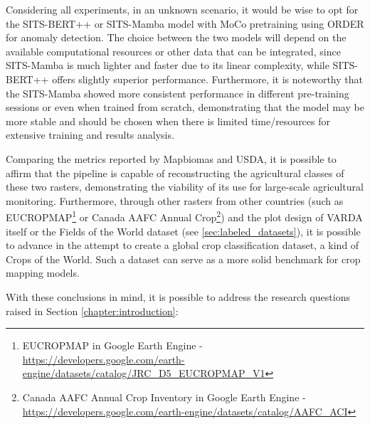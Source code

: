 Considering all experiments, in an unknown scenario, it would be wise to opt for the SITS-BERT++ or SITS-Mamba model with MoCo pretraining using \ac{ORDER} for anomaly detection. The choice between the two models will depend on the available computational resources or other data that can be integrated, since SITS-Mamba is much lighter and faster due to its linear complexity, while SITS-BERT++ offers slightly superior performance. Furthermore, it is noteworthy that the SITS-Mamba showed more consistent performance in different pre-training sessions or even when trained from scratch, demonstrating that the model may be more stable and should be chosen when there is limited time/resources for extensive training and results analysis.

Comparing the metrics reported by Mapbiomas and USDA, it is possible to affirm that the pipeline is capable of reconstructing the agricultural classes of these two rasters, demonstrating the viability of its use for large-scale agricultural monitoring. Furthermore, through other rasters from other countries (such as EUCROPMAP\footnote{EUCROPMAP in Google Earth Engine - \url{https://developers.google.com/earth-engine/datasets/catalog/JRC_D5_EUCROPMAP_V1}} or Canada AAFC Annual Crop\footnote{Canada AAFC Annual Crop Inventory in Google Earth Engine - \url{https://developers.google.com/earth-engine/datasets/catalog/AAFC_ACI}}) and the plot design of VARDA itself or the Fields of the World dataset (see \autoref{sec:labeled_datasets}), it is possible to advance in the attempt to create a global crop classification dataset, a kind of Crops of the World. Such a dataset can serve as a more solid benchmark for crop mapping models.

With these conclusions in mind, it is possible to address the research questions raised in Section \ref{chapter:introduction}:

